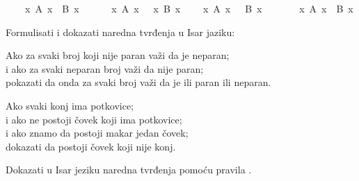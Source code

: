 \begin{isabellebody}
\begin{exercise}[subtitle=Isar dokazi u logici prvog reda.]
\isanewline
\ \ \ {\isachardoublequoteopen}{\isasymexists}\ x{\isachardot}{\kern0pt}\ A\ x\ {\isasymor}\ B\ x{\isachardoublequoteclose}\isanewline
\ \ \ \ \ {\isachardoublequoteopen}{\isacharparenleft}{\kern0pt}{\isasymexists}\ x{\isachardot}{\kern0pt}\ A\ x{\isacharparenright}{\kern0pt}\ {\isasymor}\ {\isacharparenleft}{\kern0pt}{\isasymexists}\ x{\isachardot}{\kern0pt}\ B\ x{\isacharparenright}{\kern0pt}{\isachardoublequoteclose}%
\isadelimproof
%
\endisadelimproof
%
\isatagproof
%
\endisatagproof
{\isafoldproof}%
%
\isadelimproof
%
\endisadelimproof
\isanewline
{}\isamarkupfalse%
\isanewline
\ \ \ {\isachardoublequoteopen}{\isasymforall}\ x{\isachardot}{\kern0pt}\ A\ x\ {\isasymlongrightarrow}\ {\isasymnot}\ B\ x{\isachardoublequoteclose}\isanewline
\ \ \ \ \ {\isachardoublequoteopen}{\isasymnot}\ {\isacharparenleft}{\kern0pt}{\isasymexists}\ x{\isachardot}{\kern0pt}\ A\ x\ {\isasymand}\ B\ x{\isacharparenright}{\kern0pt}{\isachardoublequoteclose}%
\isadelimproof
%
\endisadelimproof
%
\isatagproof
%
\endisatagproof
{\isafoldproof}%
%
\isadelimproof
%
\endisadelimproof
%
\begin{isamarkuptext}%
Formulisati i dokazati naredna tvrđenja u Isar jaziku:%
\end{isamarkuptext}\isamarkuptrue%
%
\begin{isamarkuptext}%
Ako za svaki broj koji nije paran važi da je neparan;\\
      i ako za svaki neparan broj važi da nije paran;\\
      pokazati da onda za svaki broj važi da je ili paran ili neparan.%
\end{isamarkuptext}\isamarkuptrue%
%
\begin{isamarkuptext}%
Ako svaki konj ima potkovice;\\
      i ako ne postoji čovek koji ima potkovice;\\
      i ako znamo da postoji makar jedan čovek;\\
      dokazati da postoji čovek koji nije konj.%
\end{isamarkuptext}\isamarkuptrue%
%
\end{exercise}
%
\begin{exercise}[subtitle=Pravilo ccontr i classical.]
%
\begin{isamarkuptext}%
Dokazati u Isar jeziku naredna tvrđenja pomoću pravila .%
\end{isamarkuptext}\isamarkuptrue%
\isamarkupfalse%

\end{exercise}
\end{isabellebody}

